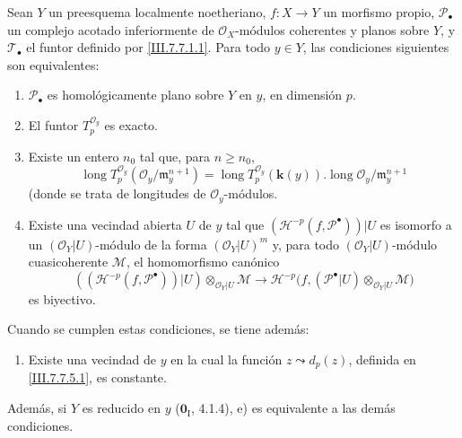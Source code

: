 \begin{proposition}[7.8.4]
\label{III.7.8.4}
Sean $Y$ un preesquema localmente noetheriano, $f:X\to Y$ un
morfismo propio, $\mathscr P_\bullet$ un complejo acotado
inferiormente de $\mathscr O_X$-módulos coherentes y planos sobre
$Y$, y $\mathscr T_\bullet$ el funtor definido por
\eqref{III.7.7.1.1}. Para todo $y\in Y$, las condiciones siguientes
son equivalentes:
\begin{enumerate}
  \item[\textup{a)}] $\mathscr P_\bullet$ es homológicamente plano sobre $Y$
    en $y$, en dimensión $p$.
  \item[\textup{b)}] El funtor $T_p^{\mathscr O_y}$ es exacto.
  \item[\textup{c)}] Existe un entero $n_0$ tal que, para $n\geq n_0$,
    \[
      \operatorname{long}T_p^{\mathscr O_y}
        (\mathscr O_y/\mathfrak m_y^{n+1})
      =
      \operatorname{long}T_p^{\mathscr O_y}(\boldsymbol{k}(y))
      .
      \operatorname{long}\mathscr O_y/\mathfrak m_y^{n+1}
      \tag{7.8.4.1}\label{III.7.8.4.1.fr}
    \]
(donde se trata de longitudes de $\mathscr O_y$-módulos.
  \item[\textup{d)}] Existe una vecindad abierta $U$ de $y$ tal que
    $(\mathcal H^{-p}(f,\mathscr P^\bullet))|U$
    es isomorfo a un $(\mathscr O_Y|U)$-módulo de la forma
    $(\mathscr O_Y|U)^m$ y, para todo $(\mathscr O_Y|U)$-módulo
    cuasicoherente $\mathscr M$, el homomorfismo canónico
    \[
      ((\mathcal H^{-p}(f,\mathscr P^\bullet))|U)
      \otimes_{\mathscr O_Y|U}\mathscr M
      \longrightarrow
      \mathcal H^{-p}
      \bigl(
        f,(\mathscr P^\bullet|U)
          \otimes_{\mathscr O_Y|U}\mathscr M
      \bigr)
      \tag{7.8.4.2}\label{III.7.8.4.2.fr}
    \]
    es biyectivo.
\end{enumerate}
Cuando se cumplen estas condiciones, se tiene además:
\begin{enumerate}
  \item[\textup{e)}] Existe una vecindad de $y$ en la cual la función
    $z\leadsto d_p(z)$, definida en \eqref{III.7.7.5.1}, es
    constante.
\end{enumerate}
Además, si $Y$ es \textup{reducido} en $y$ \textup{($\mathbf{0}_{\mathrm I}$, 4.1.4)}, e) es
equivalente a las demás condiciones.
\end{proposition}


